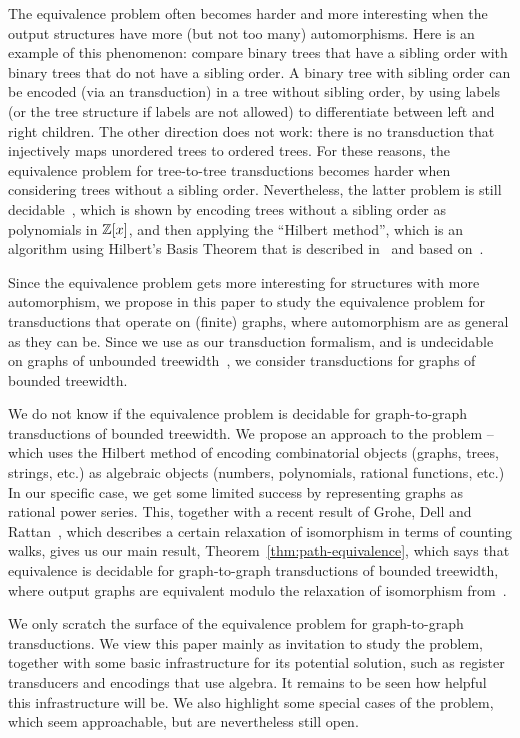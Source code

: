 The equivalence problem often becomes harder and more interesting  when the output structures have more (but not too many) automorphisms. Here is an example of this phenomenon: compare binary trees that have a sibling order with  binary trees that do not have a sibling order. A binary tree with sibling order can be encoded (via an \mso transduction) in a tree without sibling order, by using labels (or the tree structure if labels are not allowed) to differentiate between left and right children. The other direction does not work: there is no \mso transduction that injectively maps unordered trees to ordered trees. For these reasons, the equivalence problem for tree-to-tree transductions becomes harder when considering trees without a sibling order. Nevertheless, the latter problem is still decidable~\cite[Section 6]{boiretReducingTransducerEquivalence2018}, which is shown by encoding trees without a sibling order as polynomials in $\mathbb Z[x]$, and then applying the ``Hilbert method'', which is an algorithm using Hilbert's Basis Theorem that is described in~\cite{siglog2019} and based on~\cite{seidlManethKemper2018}.

Since  the equivalence problem gets more interesting for  structures with more automorphism, we propose in this paper to study the equivalence problem for transductions that operate on (finite) graphs, where automorphism are as general as they can be. Since we use \mso as our transduction formalism, and  \mso is undecidable on graphs of unbounded treewidth~\cite[Theorem 8]{seese1991structure}, we consider \mso transductions for graphs of bounded treewidth.

We do not know if the equivalence problem is decidable for \mso graph-to-graph transductions of bounded treewidth. We propose an approach to the problem -- which uses the Hilbert method of encoding combinatorial objects (graphs, trees, strings, etc.) as algebraic objects (numbers, polynomials, rational functions, etc.) In our specific case, we get some limited success by representing graphs as rational power series. This, together with a recent result  of Grohe, Dell and Rattan~\cite[Theorem 2]{groheDellRattan2018}, which describes a certain relaxation of isomorphism in terms of counting walks, gives us our main result, Theorem~\ref{thm:path-equivalence}, which says that equivalence is decidable for  graph-to-graph transductions of bounded treewidth, where output  graphs are equivalent modulo the relaxation of isomorphism from~\cite{groheDellRattan2018}.

We only scratch the surface of the equivalence problem for graph-to-graph transductions. We view this paper mainly as invitation to study the problem, together with some  basic infrastructure for its potential solution, such as register transducers and encodings that use algebra. It remains to be seen how helpful this infrastructure will be. We also highlight some special cases of the problem, which seem approachable, but are nevertheless still open. 


